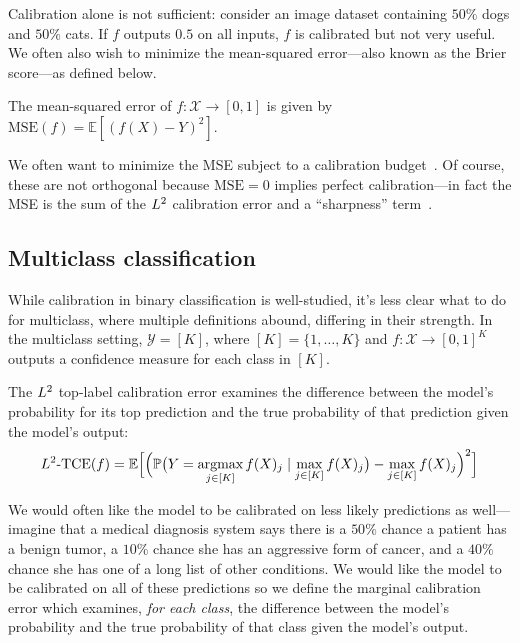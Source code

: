 Calibration alone is not sufficient: consider an image dataset containing $50\%$ dogs and $50\%$ cats.
If $f$ outputs $0.5$ on all inputs, $f$ is calibrated but not very useful.
We often also wish to minimize the mean-squared error---also known as the Brier score---as defined below.

\begin{definition}
The mean-squared error of $f : \mathcal{X} \to [0, 1]$ is given by $\mbox{MSE}(f) = \mathbb{E}[(f(X) - Y)^2]$.
\end{definition}

We often want to minimize the MSE subject to a calibration budget~\cite{gneiting2005weather, gneiting2007probabilistic}. Of course, these are not orthogonal because $\mbox{MSE} = 0$ implies perfect calibration---in fact the MSE is the sum of the $L^2$ calibration error and a ``sharpness'' term~\cite{murphy1973vector,degroot1983forecasters, kuleshov2015calibrated}.

\subsection{Multiclass classification}

While calibration in binary classification is well-studied,
it's less clear what to do for multiclass, where multiple definitions abound, differing in their strength. In the multiclass setting, $\mathcal{Y} = [K]$, where $[K] = \{1, \dots, K\}$ and $f : \mathcal{X} \to [0, 1]^K$ outputs a confidence measure for each class in $[K]$.

\begin{definition}
The $L^2$ top-label calibration error examines the difference between the model's probability for its top prediction and the true probability of that prediction given the model's output:
\begin{align}
L^2\mbox{-TCE}(f) = \mathbb{E}\Big[ \Big( \mathbb{P}\big(Y = \mathop{\mbox{argmax}}_{j \in [K]} f(X)_j \mid \max_{j \in [K]} f(X)_j\big) - \max_{j \in [K]} f(X)_j \Big)^2 \Big]
\end{align}
\end{definition}

We would often like the model to be calibrated on less likely predictions as well---imagine that a medical diagnosis system says there is a $50\%$ chance a patient has a benign tumor, a $10\%$ chance she has an aggressive form of cancer, and a $40\%$ chance she has one of a long list of other conditions. We would like the model to be calibrated on all of these predictions so we define the marginal calibration error which examines, \emph{for each class}, the difference between the model's probability and the true probability of that class given the model's output.

